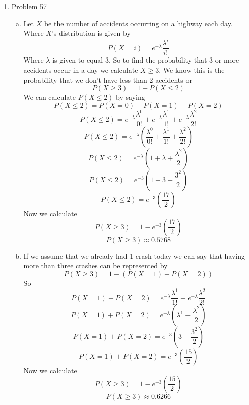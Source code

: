 \documentclass[11pt]{article}
\begin{document}
\begin{enumerate}
\item Problem 57
\begin{enumerate}[(a)]
\item
Let $X$ be the number of accidents occurring on a highway each day. Where $X$'s distribution is given by
$$P(X=i) = e^{-\lambda}\frac{\lambda^i}{i!}$$
Where $\lambda$ is given to equal $3$. So to find the probability that 3 or more accidents occur in a day we calculate $X\ge3$. We know this is the probability that we don't have less than 2 accidents or
$$P(X\ge3) = 1- P(X\le2)$$
We can calculate $P(X\le2)$ by saying
$$P(X\le2) = P(X=0)+P(X=1)+P(X=2)$$
$$P(X\le2) = e^{-\lambda}\frac{\lambda^0}{0!} + e^{-\lambda}\frac{\lambda^1}{1!} + e^{-\lambda}\frac{\lambda^2}{2!}$$
$$P(X\le2) = e^{-\lambda}\left(\frac{\lambda^0}{0!} + \frac{\lambda^1}{1!} + \frac{\lambda^2}{2!}\right)$$
$$P(X\le2) = e^{-\lambda}\left(1 + \lambda + \frac{\lambda^2}{2}\right)$$
$$P(X\le2) = e^{-3}\left(1 + 3 + \frac{3^2}{2}\right)$$
$$P(X\le2) = e^{-3}\left(\frac{17}{2}\right)$$
Now we calculate
$$P(X\ge3) = 1 - e^{-3}\left(\frac{17}{2}\right)$$
$$P(X\ge3) \approx 0.5768$$
\item
If we assume that we already had 1 crash today we can say that having more than three crashes can be represented by
$$P(X\ge3) = 1- (P(X=1)+P(X=2))$$
So 
$$P(X=1)+P(X=2) = e^{-\lambda}\frac{\lambda^1}{1!} + e^{-\lambda}\frac{\lambda^2}{2!}$$
$$P(X=1)+P(X=2) = e^{-\lambda}\left(\lambda^1+\frac{\lambda^2}{2}\right)$$
$$P(X=1)+P(X=2) = e^{-3}\left(3+\frac{3^2}{2}\right)$$
$$P(X=1)+P(X=2) = e^{-3}\left(\frac{15}{2}\right)$$
Now we calculate 
$$P(X\ge3) = 1- e^{-3}\left(\frac{15}{2}\right)$$
$$P(X\ge3) \approx 0.6266$$
\end{enumerate}

\end{enumerate}
\end{document}
